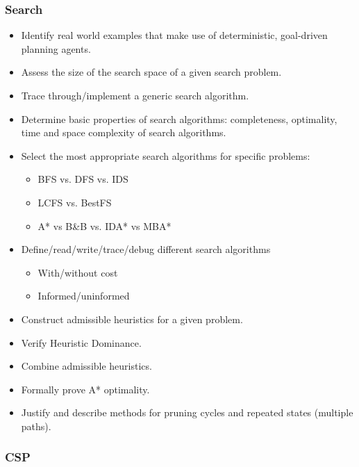 \documentclass{article}
\begin{document}
\subsubsection{Search}

\begin{itemize}
    \item Identify real world examples that make use of deterministic, goal-driven planning agents.
    \item Assess the size of the search space of a given search problem.
    \item Trace through/implement a generic search algorithm.
    \item Determine basic properties of search algorithms: completeness, optimality, time and space complexity of search algorithms.
    \item Select the most appropriate search algorithms for specific problems:
        \begin{itemize}
            \item BFS vs. DFS vs. IDS
            \item LCFS vs. BestFS
            \item A* vs B\&B vs. IDA* vs MBA*
        \end{itemize}
    \item Define/read/write/trace/debug different search algorithms
        \begin{itemize}
            \item With/without cost
            \item Informed/uninformed
        \end{itemize}
    \item Construct admissible heuristics for a given problem.
    \item Verify Heuristic Dominance.
    \item Combine admissible heuristics.
    \item Formally prove A* optimality.
    \item Justify and describe methods for pruning cycles and repeated states (multiple paths).
\end{itemize}

\subsubsection{CSP}
\end{document}
